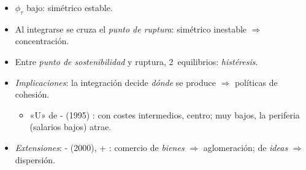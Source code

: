 \documentclass{article}
\begin{document}
\begin{columnas}
\begin{itemize}
  \begin{itemize}
  \item $\phi_\tau$ bajo: simétrico estable.
  \item Al integrarse se cruza el \emph{punto de ruptura}: simétrico inestable $\Rightarrow$ concentración.
  \item Entre \emph{punto de sostenibilidad} y ruptura, 2~equilibrios: \emph{histéresis}.
  \end{itemize}
\end{itemize}
\begin{itemize}
\item \emph{Implicaciones}: la integración decide \emph{dónde} se produce $\Rightarrow$ políticas de cohesión.
  \begin{itemize}
  \item «U» de - (1995) : con costes intermedios, centro; muy bajos, la periferia (salarios bajos) atrae.
  \end{itemize}
\item \emph{Extensiones}: - (2000), + : comercio de \emph{bienes} $\Rightarrow$ aglomeración; de \emph{ideas} $\Rightarrow$ dispersión.
\end{itemize}


\end{columnas}
\end{document}
